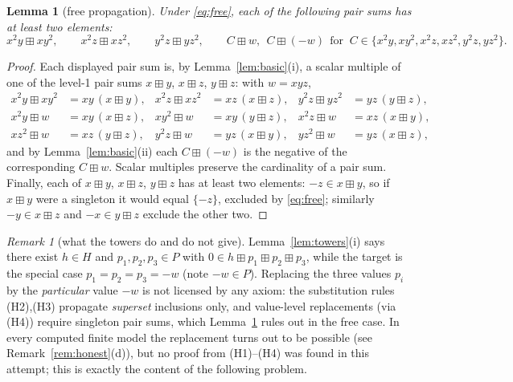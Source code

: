 \documentclass[11pt]{article}
\newtheorem{lemma}[theorem]{Lemma}
\theoremstyle{definition}
\theoremstyle{remark}
\newtheorem{remark}[theorem]{Remark}
\newcommand{\bp}{\boxplus}
\begin{document}
\begin{lemma}[free propagation]\label{lem:prop}
Under \eqref{eq:free}, each of the following pair sums has at least two
elements:
\[
  x^2y\bp xy^2,\qquad x^2z\bp xz^2,\qquad y^2z\bp yz^2,\qquad
  C\bp w,\ \ C\bp(-w)\ \ \text{for }\
  C\in\{x^2y,xy^2,x^2z,xz^2,y^2z,yz^2\}.
\]
\end{lemma}

\begin{proof}
Each displayed pair sum is, by Lemma~\ref{lem:basic}(i), a scalar multiple
of one of the level-1 pair sums $x\bp y$, $x\bp z$, $y\bp z$: with
$w=xyz$,
\begin{align*}
  x^2y\bp xy^2&=xy\,(x\bp y), &
  x^2z\bp xz^2&=xz\,(x\bp z), &
  y^2z\bp yz^2&=yz\,(y\bp z),\\
  x^2y\bp w&=xy\,(x\bp z), &
  xy^2\bp w&=xy\,(y\bp z), &
  x^2z\bp w&=xz\,(x\bp y),\\
  xz^2\bp w&=xz\,(y\bp z), &
  y^2z\bp w&=yz\,(x\bp y), &
  yz^2\bp w&=yz\,(x\bp z),
\end{align*}
and by Lemma~\ref{lem:basic}(ii) each $C\bp(-w)$ is the negative of the
corresponding $C\bp w$. Scalar multiples preserve the cardinality of a
pair sum. Finally, each of $x\bp y$, $x\bp z$, $y\bp z$ has at least two
elements: $-z\in x\bp y$, so if $x\bp y$ were a singleton it would equal
$\{-z\}$, excluded by \eqref{eq:free}; similarly
$-y\in x\bp z$ and $-x\in y\bp z$ exclude the other two.
\end{proof}

\begin{remark}[what the towers do and do not give]\label{rem:gap}
Lemma~\ref{lem:towers}(i) says there exist $h\in H$ and
$p_1,p_2,p_3\in P$ with $0\in h\bp p_1\bp p_2\bp p_3$, while the target
is the special case $p_1=p_2=p_3=-w$ (note $-w\in P$). Replacing the
three values $p_i$ by the \emph{particular} value $-w$ is not licensed by
any axiom: the substitution rules (H2),(H3) propagate \emph{superset}
inclusions only, and value-level replacements (via (H4)) require
singleton pair sums, which Lemma~\ref{lem:prop} rules out in the free
case. In every computed finite model the replacement turns out to be
possible (see Remark~\ref{rem:honest}(d)), but no proof from (H1)--(H4)
was found in this attempt; this is exactly the content of the following
problem.
\end{remark}
\end{document}
